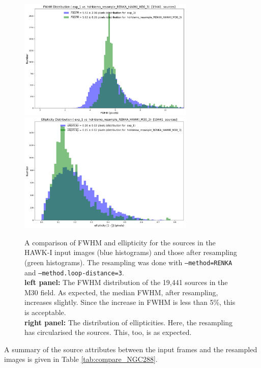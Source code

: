\begin{figure}[H]
\centering
\includegraphics[width=8.4cm]{figures/match_field_RENKA_HAWKI_M30_3_FWHM_histogram.png}
\includegraphics[width=8.4cm]{figures/match_field_RENKA_HAWKI_M30_3_ellipticity_histogram.png} 
\caption[]
	{\footnotesize  A comparison of FWHM and ellipticity for the sources in the HAWK-I input images (blue histograms) and those
	after resampling (green histograms).  The resampling was done with {\tt --method=RENKA} and {\tt --method.loop-distance=3}.\\
	{\bf left panel:}    The FWHM distribution of the 19,441 sources in the M30 field. As expected, the median FWHM, after resampling, increases slightly.  
	                           Since the increase in FWHM is less than 5\%, this is acceptable.\\
	{\bf right panel:} The distribution of ellipticities.   Here, the resampling has circularised the sources.   This, too, is as expected. 
	}
	\label{fig:fwhm_ellip_M30}
\end{figure}



A summary of the source attributes between the input frames and the resampled images is given in Table \ref{tab:compare_NGC288}.


